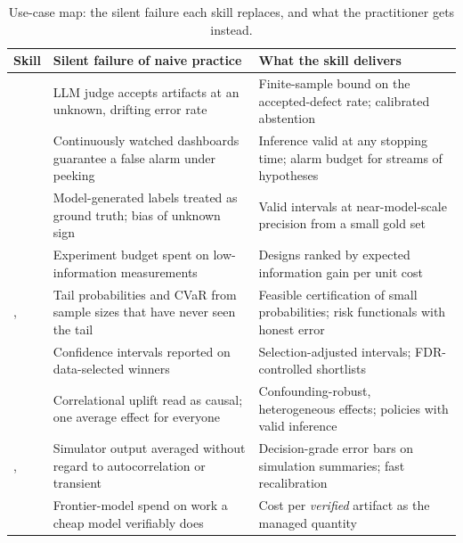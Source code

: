 \documentclass[11pt,a4paper]{article}
\begin{document}
\begin{table}[t]
\centering\small
\caption{Use-case map: the silent failure each skill replaces, and what the
practitioner gets instead.}
\label{tab:usecases}
\begin{tabular}{@{}L{3.3cm}L{5.2cm}L{5.2cm}@{}}
\toprule
Skill & Silent failure of naive practice & What the skill delivers \\
\midrule
{} & LLM judge accepts artifacts at an unknown,
drifting error rate & Finite-sample bound on the accepted-defect rate;
calibrated abstention \\
 & Continuously watched dashboards guarantee a
false alarm under peeking & Inference valid at any stopping time; alarm
budget for streams of hypotheses \\
 & Model-generated labels treated
as ground truth; bias of unknown sign & Valid intervals at near-model-scale
precision from a small gold set \\
 & Experiment budget spent on
low-information measurements & Designs ranked by expected information gain
per unit cost \\
,
 & Tail probabilities and CVaR from
sample sizes that have never seen the tail & Feasible certification of
small probabilities; risk functionals with honest error \\
 & Confidence intervals reported on
data-selected winners & Selection-adjusted intervals; FDR-controlled
shortlists \\
 & Correlational uplift read as causal; one average
effect for everyone & Confounding-robust, heterogeneous effects; policies
with valid inference \\
,
 & Simulator output averaged
without regard to autocorrelation or transient & Decision-grade error bars
on simulation summaries; fast recalibration \\
 & Frontier-model spend on work a cheap model
verifiably does & Cost per \emph{verified} artifact as the managed
quantity \\
\bottomrule
\end{tabular}
\end{table}
\end{document}
